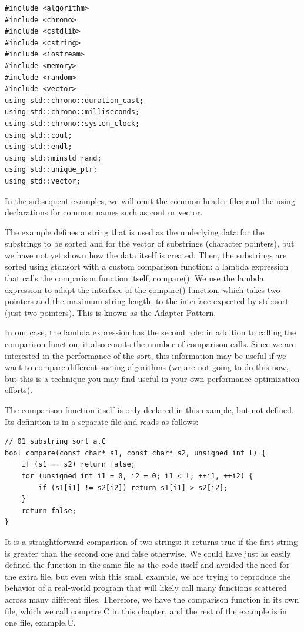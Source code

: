 \begin{lstlisting}[style=styleCXX]
#include <algorithm>
#include <chrono>
#include <cstdlib>
#include <cstring>
#include <iostream>
#include <memory>
#include <random>
#include <vector>
using std::chrono::duration_cast;
using std::chrono::milliseconds;
using std::chrono::system_clock;
using std::cout;
using std::endl;
using std::minstd_rand;
using std::unique_ptr;
using std::vector;
\end{lstlisting}

In the subsequent examples, we will omit the common header files and the using declarations for common names such as cout or vector.

The example defines a string that is used as the underlying data for the substrings to be sorted and for the vector of substrings (character pointers), but we have not yet shown how the data itself is created. Then, the substrings are sorted using std::sort with a custom comparison function: a lambda expression that calls the comparison function itself, compare(). We use the lambda expression to adapt the interface of the compare() function, which takes two pointers and the maximum string length, to the interface expected by std::sort (just two pointers). This is known as the Adapter Pattern.

In our case, the lambda expression has the second role: in addition to calling the comparison function, it also counts the number of comparison calls. Since we are interested in the performance of the sort, this information may be useful if we want to compare different sorting algorithms (we are not going to do this now, but this is a technique you may find useful in your own performance optimization efforts).

The comparison function itself is only declared in this example, but not defined. Its definition is in a separate file and reads as follows:

\begin{lstlisting}[style=styleCXX]
// 01_substring_sort_a.C
bool compare(const char* s1, const char* s2, unsigned int l) {
	if (s1 == s2) return false;
	for (unsigned int i1 = 0, i2 = 0; i1 < l; ++i1, ++i2) {
		if (s1[i1] != s2[i2]) return s1[i1] > s2[i2];
	}
	return false;
}
\end{lstlisting}

It is a straightforward comparison of two strings: it returns true if the first string is greater than the second one and false otherwise. We could have just as easily defined the function in the same file as the code itself and avoided the need for the extra file, but even with this small example, we are trying to reproduce the behavior of a real-world program that will likely call many functions scattered across many different files. Therefore, we have the comparison function in its own file, which we call compare.C in  this chapter, and the rest of the example is in one file, example.C.

